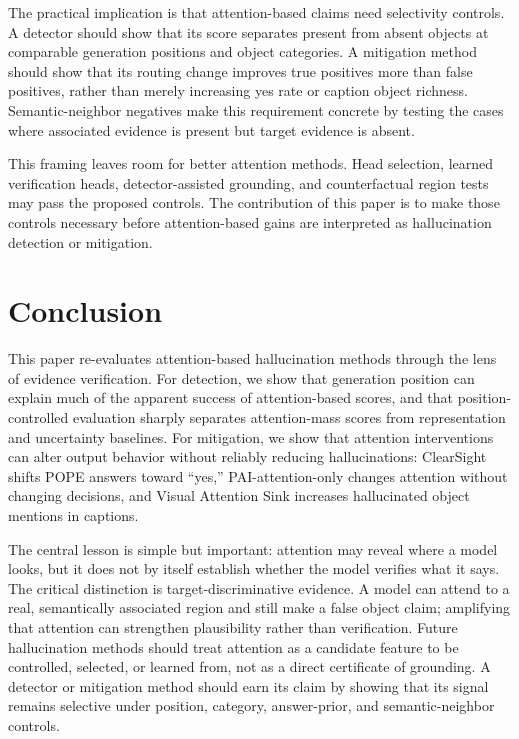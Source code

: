 \documentclass[letterpaper]{article} \usepackage[submission]{aaai2027}  \usepackage[hyphens]{url}  \usepackage{graphicx} \urlstyle{rm} \def\UrlFont{\rm}  \usepackage{natbib}  \usepackage{caption} \frenchspacing
\begin{document}
\noindent The practical implication is that attention-based claims need selectivity controls. A detector should show that its score separates present from absent objects at comparable generation positions and object categories. A mitigation method should show that its routing change improves true positives more than false positives, rather than merely increasing yes rate or caption object richness. Semantic-neighbor negatives make this requirement concrete by testing the cases where associated evidence is present but target evidence is absent.

\noindent This framing leaves room for better attention methods. Head selection, learned verification heads, detector-assisted grounding, and counterfactual region tests may pass the proposed controls. The contribution of this paper is to make those controls necessary before attention-based gains are interpreted as hallucination detection or mitigation.
 \section{Conclusion}

This paper re-evaluates attention-based hallucination methods through the lens of evidence verification. For detection, we show that generation position can explain much of the apparent success of attention-based scores, and that position-controlled evaluation sharply separates attention-mass scores from representation and uncertainty baselines. For mitigation, we show that attention interventions can alter output behavior without reliably reducing hallucinations: ClearSight shifts POPE answers toward ``yes,'' PAI-attention-only changes attention without changing decisions, and Visual Attention Sink increases hallucinated object mentions in captions.

The central lesson is simple but important: attention may reveal where a model looks, but it does not by itself establish whether the model verifies what it says. The critical distinction is target-discriminative evidence. A model can attend to a real, semantically associated region and still make a false object claim; amplifying that attention can strengthen plausibility rather than verification. Future hallucination methods should treat attention as a candidate feature to be controlled, selected, or learned from, not as a direct certificate of grounding. A detector or mitigation method should earn its claim by showing that its signal remains selective under position, category, answer-prior, and semantic-neighbor controls.
\end{document}
